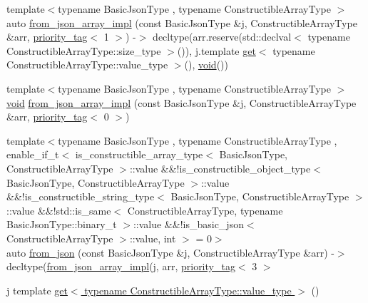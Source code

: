 \begin{DoxyCompactItemize}
\item 
{\footnotesize template$<$typename Basic\+Json\+Type , typename Constructible\+Array\+Type $>$ }\\auto \hyperlink{namespacenlohmann_1_1detail_a464e1246f3df7edea79c3f81ab701edd}{from\+\_\+json\+\_\+array\+\_\+impl} (const Basic\+Json\+Type \&j, Constructible\+Array\+Type \&arr, \hyperlink{structnlohmann_1_1detail_1_1priority__tag}{priority\+\_\+tag}$<$ 1 $>$) -\/$>$ decltype(arr.\+reserve(std\+::declval$<$ typename Constructible\+Array\+Type\+::size\+\_\+type $>$()), j.\+template \hyperlink{namespacenlohmann_1_1detail_acc422c11342b31368f610b6f96fcedc6}{get}$<$ typename Constructible\+Array\+Type\+::value\+\_\+type $>$(), \hyperlink{namespacenlohmann_1_1detail_a59fca69799f6b9e366710cb9043aa77d}{void}())
\item 
{\footnotesize template$<$typename Basic\+Json\+Type , typename Constructible\+Array\+Type $>$ }\\\hyperlink{namespacenlohmann_1_1detail_a59fca69799f6b9e366710cb9043aa77d}{void} \hyperlink{namespacenlohmann_1_1detail_a20cf21255e75cff1ffb0869c2c545e63}{from\+\_\+json\+\_\+array\+\_\+impl} (const Basic\+Json\+Type \&j, Constructible\+Array\+Type \&arr, \hyperlink{structnlohmann_1_1detail_1_1priority__tag}{priority\+\_\+tag}$<$ 0 $>$)
\item 
{\footnotesize template$<$typename Basic\+Json\+Type , typename Constructible\+Array\+Type , enable\+\_\+if\+\_\+t$<$ is\+\_\+constructible\+\_\+array\+\_\+type$<$ Basic\+Json\+Type, Constructible\+Array\+Type $>$\+::value \&\&!is\+\_\+constructible\+\_\+object\+\_\+type$<$ Basic\+Json\+Type, Constructible\+Array\+Type $>$\+::value \&\&!is\+\_\+constructible\+\_\+string\+\_\+type$<$ Basic\+Json\+Type, Constructible\+Array\+Type $>$\+::value \&\&!std\+::is\+\_\+same$<$ Constructible\+Array\+Type, typename Basic\+Json\+Type\+::binary\+\_\+t $>$\+::value \&\&!is\+\_\+basic\+\_\+json$<$ Constructible\+Array\+Type $>$\+::value, int $>$  = 0$>$ }\\auto \hyperlink{namespacenlohmann_1_1detail_a14d8cdf544585f1c38eab6a0820e55f7}{from\+\_\+json} (const Basic\+Json\+Type \&j, Constructible\+Array\+Type \&arr) -\/$>$ decltype(\hyperlink{namespacenlohmann_1_1detail_a40f7bb070a60e8ba14fffb9c117fcbd8}{from\+\_\+json\+\_\+array\+\_\+impl}(j, arr, \hyperlink{structnlohmann_1_1detail_1_1priority__tag}{priority\+\_\+tag}$<$ 3 $>$
\item 
j template \hyperlink{namespacenlohmann_1_1detail_ad9e016d7b6a3cd2847027950aa0aac3b}{get$<$ typename Constructible\+Array\+Type\+::value\+\_\+type $>$} ()

\end{DoxyCompactItemize}
